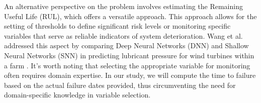 \documentclass{article}
\begin{document}
An alternative perspective on the problem involves estimating the Remaining Useful Life (RUL), which offers a versatile approach. This approach allows for the setting of thresholds to define significant risk levels or monitoring specific variables that serve as reliable indicators of system deterioration. Wang et al. addressed this aspect by comparing Deep Neural Networks (DNN) and Shallow Neural Networks (SNN) in predicting lubricant pressure for wind turbines within a farm \cite{wang2016}. It's worth noting that selecting the appropriate variable for monitoring often requires domain expertise. In our study, we will compute the time to failure based on the actual failure dates provided, thus circumventing the need for domain-specific knowledge in variable selection. \\

\newpage



\end{document}
